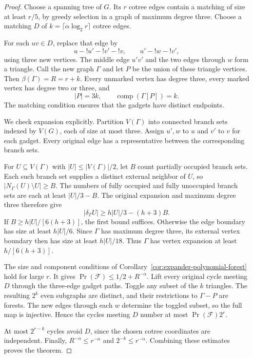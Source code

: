 \begin{proof}
Choose a spanning tree of $G$.
Its $r$ cotree edges contain a matching of size at least $r/5$, by greedy selection in a graph of maximum degree three.
Choose a matching $D$ of $k=\lceil\alpha\log_2r\rceil$ cotree edges.

For each $uv\in D$, replace that edge by
\[
 u\!-!u'\!-!v'\!-!v,
 \qquad u'\!-!w\!-!v',
\]
using three new vertices.
The middle edge $u'v'$ and the two edges through $w$ form a triangle.
Call the new graph $\Gamma$ and let $P$ be the union of these triangle vertices.
Then $\beta(\Gamma)=R=r+k$.
Every unmarked vertex has degree three, every marked vertex has degree two or three, and
\[
 |P|=3k,\qquad \operatorname{comp}(\Gamma[P])=k.
\]
The matching condition ensures that the gadgets have distinct endpoints.

We check expansion explicitly.
Partition $V(\Gamma)$ into connected branch sets indexed by $V(G)$, each of size at most three.
Assign $u',w$ to $u$ and $v'$ to $v$ for each gadget.
Every original edge has a representative between the corresponding branch sets.

For $U\subseteq V(\Gamma)$ with $|U|\le|V(\Gamma)|/2$, let $B$ count partially occupied branch sets.
Each such branch set supplies a distinct external neighbor of $U$, so $|N_\Gamma(U)\setminus U|\ge B$.
The numbers of fully occupied and fully unoccupied branch sets are each at least $|U|/3-B$.
The original expansion and maximum degree three therefore give
\[
 |\delta_\Gamma U|\ge h|U|/3-(h+3)B.
\]
If $B\ge h|U|/[6(h+3)]$, the first bound suffices.
Otherwise the edge boundary has size at least $h|U|/6$.
Since $\Gamma$ has maximum degree three, its external vertex boundary then has size at least $h|U|/18$.
Thus $\Gamma$ has vertex expansion at least $h/[6(h+3)]$.

The size and component conditions of Corollary~\ref{cor:expander-polynomial-forest} hold for large $r$.
It gives $\Pr(\mathcal F)\le1/2+R^{-\alpha}$.
Lift every original cycle meeting $D$ through the three-edge gadget paths.
Toggle any subset of the $k$ triangles.
The resulting $2^k$ even subgraphs are distinct, and their restrictions to $\Gamma-P$ are forests.
The new edges through each $w$ determine the toggled subset, so the full map is injective.
Hence the cycles meeting $D$ number at most $\Pr(\mathcal F)2^r$.

At most $2^{r-k}$ cycles avoid $D$, since the chosen cotree coordinates are independent.
Finally, $R^{-\alpha}\le r^{-\alpha}$ and $2^{-k}\le r^{-\alpha}$.
Combining these estimates proves the theorem.
\end{proof}

